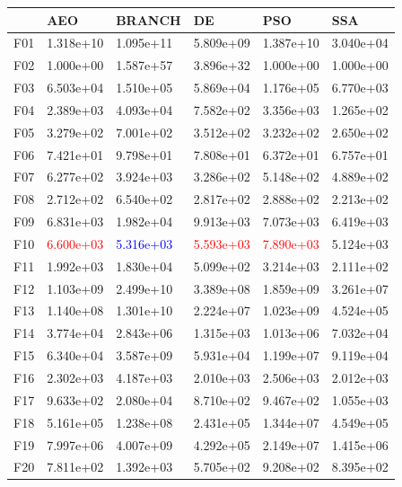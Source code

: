 \documentclass{article}
\begin{document}
\begin{table}[H]
	\centering
	\begin{tabular}{|l|lllll|}
		\hline
		{} &        AEO &     BRANCH &         DE &        PSO &        SSA \\
		\hline
		F01  &  1.318e+10 &  1.095e+11 &  5.809e+09 &  1.387e+10 &  3.040e+04 \\
		F02  &  1.000e+00 &  1.587e+57 &  3.896e+32 &  1.000e+00 &  1.000e+00 \\
		F03  &  6.503e+04 &  1.510e+05 &  5.869e+04 &  1.176e+05 &  6.770e+03 \\
		F04  &  2.389e+03 &  4.093e+04 &  7.582e+02 &  3.356e+03 &  1.265e+02 \\
		F05  &  3.279e+02 &  7.001e+02 &  3.512e+02 &  3.232e+02 &  2.650e+02 \\
		F06  &  7.421e+01 &  9.798e+01 &  7.808e+01 &  6.372e+01 &  6.757e+01 \\
		F07  &  6.277e+02 &  3.924e+03 &  3.286e+02 &  5.148e+02 &  4.889e+02 \\
		F08  &  2.712e+02 &  6.540e+02 &  2.817e+02 &  2.888e+02 &  2.213e+02 \\
		F09  &  6.831e+03 &  1.982e+04 &  9.913e+03 &  7.073e+03 &  6.419e+03 \\
		F10  &  \textcolor{red}{6.600e+03} &  \textcolor{blue}{5.316e+03} &  \textcolor{red}{5.593e+03} &  \textcolor{red}{7.890e+03} &  5.124e+03 \\
		F11  &  1.992e+03 &  1.830e+04 &  5.099e+02 &  3.214e+03 &  2.111e+02 \\
		F12  &  1.103e+09 &  2.499e+10 &  3.389e+08 &  1.859e+09 &  3.261e+07 \\
		F13  &  1.140e+08 &  1.301e+10 &  2.224e+07 &  1.023e+09 &  4.524e+05 \\
		F14  &  3.774e+04 &  2.843e+06 &  1.315e+03 &  1.013e+06 &  7.032e+04 \\
		F15  &  6.340e+04 &  3.587e+09 &  5.931e+04 &  1.199e+07 &  9.119e+04 \\
		F16  &  2.302e+03 &  4.187e+03 &  2.010e+03 &  2.506e+03 &  2.012e+03 \\
		F17  &  9.633e+02 &  2.080e+04 &  8.710e+02 &  9.467e+02 &  1.055e+03 \\
		F18  &  5.161e+05 &  1.238e+08 &  2.431e+05 &  1.344e+07 &  4.549e+05 \\
		F19  &  7.997e+06 &  4.007e+09 &  4.292e+05 &  2.149e+07 &  1.415e+06 \\
		F20  &  7.811e+02 &  1.392e+03 &  5.705e+02 &  9.208e+02 &  8.395e+02 \\

\end{tabular}
\end{table}
\end{document}
